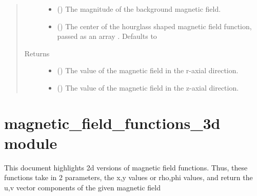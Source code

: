\documentclass[letterpaper,10pt,english]{sphinxmanual}
\begin{document}
\begin{fulllineitems}
\begin{quote}
\begin{description}
\begin{itemize}
\item {} 
 () \textendash{} The magnitude of the background magnetic field.

\item {} 
 () \textendash{} The center of the hourglass shaped magnetic field function, passed
as an array \sphinxcode{\sphinxupquote{{[}r0,z0{]}}}. Defaults to \sphinxcode{\sphinxupquote{{[}0,0{]}}}

\end{itemize}

\item[{Returns}] \leavevmode
\begin{itemize}
\item {} 
 () \textendash{} The value of the magnetic field in the r-axial direction.

\item {} 
 () \textendash{} The value of the magnetic field in the z-axial direction.

\end{itemize}


\end{description}\end{quote}

\end{fulllineitems}



\section{magnetic\_field\_functions\_3d module}
\label{\detokenize{magnetic_field_functions_3d:module-magnetic_field_functions_3d}}\label{\detokenize{magnetic_field_functions_3d:magnetic-field-functions-3d-module}}\label{\detokenize{magnetic_field_functions_3d::doc}}
This document highlights 2d versions of magnetic field functions. Thus, these
functions take in 2 parameters, the x,y values or rho,phi values, and return
the u,v vector components of the given magnetic field
\end{document}
